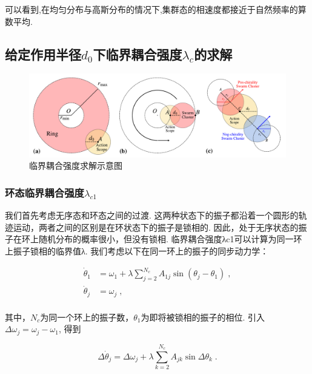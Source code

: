 \documentclass{article}
\begin{document}
\vspace{-0.5cm}

可以看到,在均匀分布与高斯分布的情况下,集群态的相速度都接近于自然频率的算数平均.

\subsection{给定作用半径$d_0$下临界耦合强度$\lambda_c$的求解}

\begin{figure}[H]
    \includegraphics[width=\textwidth]{./figs/analyticalEps.pdf}
    \caption{
        \label{fig:analyticalEps}临界耦合强度求解示意图
    }
\end{figure}

\subsubsection{环态临界耦合强度$\lambda_{c1}$}

我们首先考虑无序态和环态之间的过渡. 这两种状态下的振子都沿着一个圆形的轨迹运动，两者之间的区别是在环状态下的振子是锁相的. 因此，处于无序状态的振子在环上随机分布的概率很小，但没有锁相. 临界耦合强度λc1可以计算为同一环上振子锁相的临界值λ. 我们考虑以下在同一环上的振子的同步动力学：

\begin{equation}\label{eq:eq2}
    \begin{aligned}
        \dot{\theta}_1&=\omega _1+\lambda \sum_{j=2}^{N_c}{A_{1j}\sin \left( \theta _j-\theta _1 \right)}\;,\\
        \dot{\theta}_j&=\omega _j\;,\\
    \end{aligned}
\end{equation}

其中，$N_c$为同一个环上的振子数，$\theta_1$为即将被锁相的振子的相位. 引入$\Delta\omega_j=\omega_j-\omega_1$, 得到

\begin{equation}
    \label{eq:dotDeltaTheta}
    \Delta\dot{\theta}_j=\Delta \omega _j+\lambda \sum_{k=2}^{N_c}{A_{jk}\sin \Delta \theta _k}\;.
\end{equation}
\end{document}

